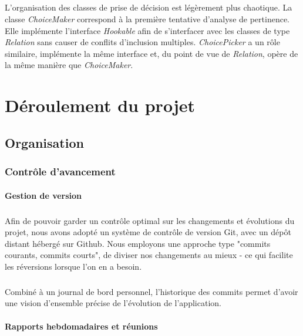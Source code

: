\documentclass[a4paper,10pt]{report}
\begin{document}
\paragraph{}
  L'organisation des classes de prise de décision est légèrement plus chaotique.
La classe \textit{ChoiceMaker} correspond à la première tentative d'analyse de
pertinence. Elle implémente l'interface \textit{Hookable} afin de s'interfacer
avec les classes de type \textit{Relation} sans causer de conflits d'inclusion
multiples. \textit{ChoicePicker} a un rôle similaire, implémente la même
interface et, du point de vue de \textit{Relation}, opère de la même manière
que \textit{ChoiceMaker}.


\chapter{Déroulement du projet}
\section{Organisation}
\subsection{Contrôle d'avancement}

\subsubsection{Gestion de version}
\paragraph{}
  Afin de pouvoir garder un contrôle optimal sur les changements et évolutions
du projet, nous avons adopté un système de contrôle de version Git, avec un
dépôt distant hébergé sur Github. Nous employons une approche type "commits
courants, commits courts", de diviser nos changements au mieux - ce qui facilite
les réversions lorsque l'on en a besoin.

\paragraph{}
  Combiné à un journal de bord personnel, l'historique des commits permet
d'avoir une vision d'ensemble précise de l'évolution de l'application.

\subsubsection{Rapports hebdomadaires et réunions}
\end{document}
